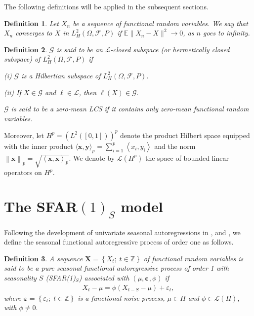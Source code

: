 \documentclass[11pt,a4paper]{article}
\newtheorem{definition} {Definition}[section]
\numberwithin{equation}{section}
\newcommand{\E}{\mathbb{E}}
\begin{document}
The following definitions will be applied in the subsequent sections.
\begin{definition}
  Let $X_n$ be a sequence of functional random variables. We say that $X_n$ converges to $X$ in $L^2_H(\Omega,\mathcal{F},P)$ if $\E\|X_n-X\|^2\rightarrow 0$, as $n$ goes to infinity.
\end{definition}
\begin{definition}
  $\mathcal{G}$ is said to be an $\mathcal{L}$-closed subspace (or hermetically closed subspace) of $L^2_H(\Omega,\mathcal{F},P)$ if
  \begin{compactitem}[(i)]
    \item [(i)] $\mathcal{G}$ is a Hilbertian subspace of $L^2_H(\Omega,\mathcal{F},P).$
    \item [(ii)] If $X\in \mathcal{G}$ and $\ell\in \mathcal{L}$, then $\ell(X)\in \mathcal{G}.$
  \end{compactitem}
  $\mathcal{G}$ is said to be a zero-mean LCS if it contains only zero-mean functional random variables.
\end{definition}
Moreover, let $H^p=\left(L^2([0,1])\right)^p$ denote the product Hilbert space equipped with the inner product $\langle {\mathbf{x}},{\mathbf{y}}\rangle_p=\sum_{i=1}^p\left\langle x_i,y_i\right\rangle$ and the norm $\left\|{\mathbf{x}}\right\|_p=\sqrt {\left\langle {\mathbf{x}},{\mathbf{x}}\right\rangle_p}$. We denote by $\mathcal{L}(H^p)$ the space of bounded linear operators on $H^p.$


\section[The SFAR(1)s model]{The SFAR$(1)_{S}$ model}\label{sec:SFAR1}

Following the development of univariate seasonal autoregressions in \citet{harrison1965short}, \citet{chatfield1973box} and \citet{box2015}, we define the seasonal functional autoregressive process of order one as follows.

\begin{definition}
  A sequence $\bm{X}=\left\{X_{t};\;t\in\mathbb{Z}\right\}$ of functional random variables is said to be a pure seasonal functional autoregressive process of order 1 with seasonality $S$ (SFAR(1)$_S$) associated with $\left(\mu,\bm{\varepsilon},\phi\right)$ if
  \begin{align}\label{eq-pureseasonality}
    X_{t}-\mu=\phi\left(X_{t-S}-\mu\right)+\varepsilon_{t},
  \end{align}
  where $\bm{\varepsilon}=\left\{\varepsilon_{t};\; t\in\mathbb{Z}\right\}$ is a functional noise process, $\mu\in H$ and $\phi\in\mathcal{L}(H)$, with $\phi\neq 0.$
\end{definition}
\end{document}

